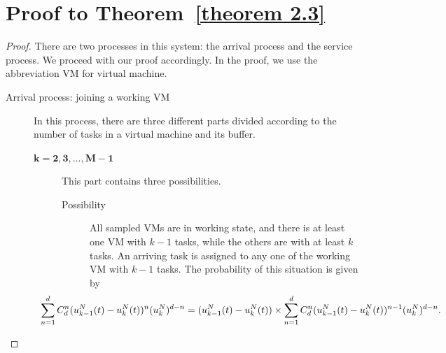 \documentclass[12pt]{article}
\begin{document}
\section{Proof to Theorem~\ref{theorem 2.3}}
\label{appendix B}

\begin{proof}
 There are two processes in this system: the arrival process and the service process. We proceed with our proof accordingly. In the proof, we use the abbreviation VM for virtual machine.

\begin{description}
  \item[Arrival process: joining a working VM]
  In this process, there are three different parts divided according to the number of tasks in a virtual machine and its buffer. %
        \begin{description}
            \item [$\mathbf{k=2,3,\ldots,M-1}$]
                This part contains three possibilities.
                \begin{description}

                    \item[Possibility \uppercase\expandafter{}] All sampled VMs are in working state, and there is at least one VM with $k-1$ tasks, while the others are with at least $k$ tasks. An arriving task is assigned to any one of the working VM with $k-1$ tasks. The probability of this situation is given by
                        \begin{equation}
                       \hspace*{-1.8cm} \sum\limits_{n=1}\limits^{d}C^{n}_{d}(u_{k-1}^{N}(t)-u_{k}^{N}(t))^{n}(u_{k}^{N})^{d-n}
                                 = (u_{k-1}^{N}(t)-u_{k}^{N}(t))\times  \displaystyle\sum\limits_{n=1}\limits^{d}C^{n}_{d}(u_{k-1}^{N}(t)-u_{k}^{N}(t))^{n-1}(u_{k}^{N})^{d-n}.
                        \end{equation}


\end{description}
\end{description}
\end{description}
\end{proof}
\end{document}
